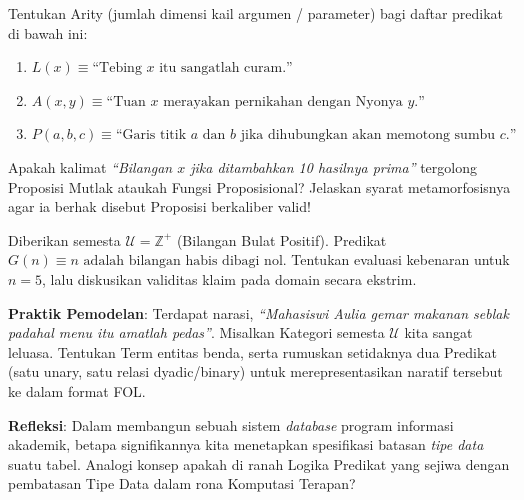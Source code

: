 \documentclass[../main]{subfiles}
\begin{document}

\begin{latihan}
  \item Tentukan Arity (jumlah dimensi kail argumen / parameter) bagi daftar predikat di bawah ini:
  \begin{enumerate}
    \item $L(x) \equiv \text{``Tebing } x \text{ itu sangatlah curam.''}$
    \item $A(x, y) \equiv \text{``Tuan } x \text{ merayakan pernikahan dengan Nyonya } y\text{.''}$
    \item $P(a, b, c) \equiv \text{``Garis titik } a \text{ dan } b \text{ jika dihubungkan akan memotong sumbu } c\text{.''}$
  \end{enumerate}
  \item Apakah kalimat \textit{``Bilangan $x$ jika ditambahkan 10 hasilnya prima''} tergolong Proposisi Mutlak ataukah Fungsi Proposisional? Jelaskan syarat metamorfosisnya agar ia berhak disebut Proposisi berkaliber valid!
  \item Diberikan semesta $\mathcal{U} = \mathbb{Z}^+$ (Bilangan Bulat Positif). Predikat $G(n) \equiv n \text{ adalah bilangan habis dibagi nol}$. Tentukan evaluasi kebenaran untuk $n=5$, lalu diskusikan validitas klaim pada domain secara ekstrim.
  \item \textbf{Praktik Pemodelan}: Terdapat narasi, \textit{``Mahasiswi Aulia gemar makanan seblak padahal menu itu amatlah pedas''}. Misalkan Kategori semesta $\mathcal{U}$ kita sangat leluasa. Tentukan Term entitas benda, serta rumuskan setidaknya dua Predikat (satu unary, satu relasi dyadic/binary) untuk merepresentasikan naratif tersebut ke dalam format FOL.
  \item \textbf{Refleksi}: Dalam membangun sebuah sistem \textit{database} program informasi akademik, betapa signifikannya kita menetapkan spesifikasi batasan \textit{tipe data} suatu tabel. Analogi konsep apakah di ranah Logika Predikat yang sejiwa dengan pembatasan Tipe Data dalam rona Komputasi Terapan?
\end{latihan}

\end{document}
